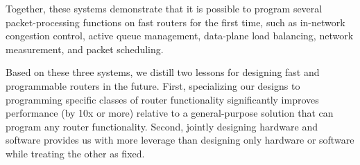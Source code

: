 Together, these systems demonstrate that it is possible to program several
packet-processing functions on fast routers for the first time, such as
in-network congestion control, active queue management, data-plane load
balancing, network measurement, and packet scheduling.

Based on these three systems, we distill two lessons for designing fast and
programmable routers in the future. First, specializing our designs to
programming specific classes of router functionality significantly improves
performance (by 10x or more) relative to a general-purpose solution that can
program any router functionality. Second, jointly designing hardware and
software provides us with more leverage than designing only hardware or
software while treating the other as fixed.
